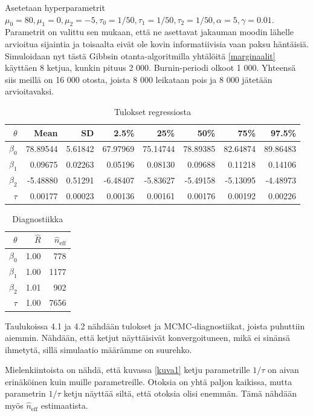 Asetetaan hyperparametrit $\mu_0 = 80,\mu_1 = 0, \mu_2 = -5, \tau_0 = 1/50, \tau_1 = 1/50, \tau_2 = 1/50, \alpha	= 5, \gamma = 0.01$. Parametrit on valittu sen mukaan, että ne asettavat jakauman moodin lähelle arvioitua sijaintia ja toisaalta eivät ole kovin informatiivisia vaan paksu häntäisiä. Simuloidaan nyt tästä Gibbsin otanta-algoritmilla yhtälöitä \ref{marginaalit} käyttäen 8 ketjua, kunkin pituus 2 000. Burnin-periodi olkoot 1 000. Yhteensä siis meillä on  16 000 otosta, joista 8 000 leikataan pois ja 8 000 jätetään arvioitavaksi.

\begin{table}[ht]
\centering
\label{results}
\begin{tabular}{rrrrrrrr}
  \hline
 $\theta$ & Mean & SD & 2.5\% & 25\% & 50\% & 75\% & 97.5\% \\ 
  \hline
  $\beta_0$ & 78.89544 & 5.61842 & 67.97969 & 75.14744 & 78.89385 & 82.64874 & 89.86483 \\ 
  $\beta_1$ & 0.09675 & 0.02263 & 0.05196 & 0.08130 & 0.09688 & 0.11218 & 0.14106 \\ 
  $\beta_2$ & -5.48880 & 0.51291 & -6.48407 & -5.83627 & -5.49158 & -5.13095 & -4.48973 \\ 
  $\tau$ & 0.00177 & 0.00023 & 0.00136 & 0.00161 & 0.00176 & 0.00192 & 0.00226 \\ 
   \hline
\end{tabular}
\caption{Tulokset regressiosta}
\end{table}
\begin{table}[ht]\label{diagnostics}
\centering
\begin{tabular}{rrr}
  \hline
 $\theta$ & $\hat{R}$ & $\hat{n}_{\mathrm{eff}}$ \\ 
  \hline
  $\beta_0$ & 1.00 & 778 \\ 
  $\beta_1$ & 1.00 & 1177 \\ 
  $\beta_2$ & 1.01 & 902  \\ 
  $\tau$ & 1.00 & 7656  \\ 
   \hline
\end{tabular}
\caption{Diagnostiikka}
\end{table}

Taulukoissa 4.1 ja 4.2 nähdään tulokset ja MCMC-diagnostiikat, joista puhuttiin aiemmin. Nähdään, että ketjut näyttäisivät konvergoituneen, mikä ei sinänsä ihmetytä, sillä simulaatio määrämme on suurehko.

Mielenkiintoista on nähdä, että kuvassa \ref{kuva1} ketju parametrille $1/\tau$ on aivan erinäköinen kuin muille parametreille. Otoksia on yhtä paljon kaikissa, mutta parametrin $1/\tau$ ketju näyttää siltä, että otoksia olisi enemmän. Tämä nähdään myös $\hat{n}_{\mathrm{eff}}$ estimaatista.

